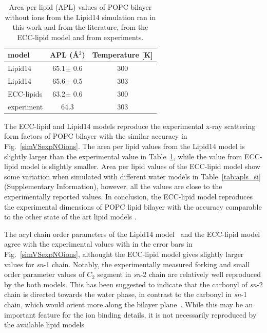 \documentclass[aip,jcp,twocolumn]{revtex4}
\begin{document}
\begin{table}
  \caption{Area per lipid (APL) values of POPC bilayer without ions from the Lipid14 simulation
    ran in this work and from the literature, from the ECC-lipid model and from experiments.\label{tab:apls} }
  \begin{tabular}{l|c c}
    model          & APL (\AA$^2$)   & Temperature [K] \\
    \hline
    Lipid14                   & 65.1$\pm$ 0.6  &  300 \\
    Lipid14 \cite{dickson14}  & 65.6$\pm$ 0.5  &  303 \\
    \hline
    ECC-lipids                & 63.2$\pm$ 0.6  &  300       \\
    \hline
    experiment \cite{kucerka11} & 64.3  &  303    \\
    \hline
  \end{tabular}
\end{table}


The ECC-lipid and Lipid14 models reproduce the experimental x-ray scattering form factors
of POPC bilayer with the similar accuracy in Fig.~\ref{simVSexpNOions}.
The area per lipid values from the Lipid14 model is slightly larger than the
experimental value in Table~\ref{tab:apls}, while the value from ECC-lipid model
is slightly smaller. Area per lipid values of the ECC-lipid model show some variation
when simulated with different water models in Table~\ref{tab:apls_si} (Supplementary Information),
however, all the values are close to the experimentally reported values.
In conclusion, the ECC-lipid model reproduces the experimental dimensions of POPC
lipid bilayer with the accuracy comparable to the other state of the art lipid models \cite{ollila16}.

The acyl chain order parameters of the Lipid14 model~\cite{dickson14} and the
ECC-lipid model agree with the experimental values with in the error bars
in Fig.~\ref{simVSexpNOions}, althought the ECC-lipid model gives slightly larger
values for {\it sn}-1 chain. Notably, the experimentally measured forking and
small order parameter values of $C_2$ segment in {\it sn}-2 chain are relatively well
reproduced by the both models. This has been suggested to indicate that the carbonyl
of {\it sn}-2 chain is directed towards the water phase, in contrast to the
carbonyl in {\it sn}-1 chain, which would orient more along the bilayer
plane~\cite{seelig75,schindler75,gawrisch92}. While this may be an important
feature for the ion binding details, it is not necessarily reproduced by the
available lipid models~\cite{ollila16}
\end{document}
